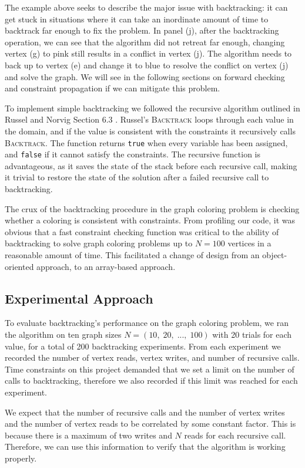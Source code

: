 \documentclass{article}
\begin{document}
		The example above seeks to describe the major issue with backtracking: it can get stuck in situations where it can take an inordinate amount of time to backtrack far enough to fix the problem. In panel (j), after the backtracking operation, we can see that the algorithm did not retreat far enough, changing vertex (g) to pink still results in a conflict in vertex (j). The algorithm needs to back up to vertex (e) and change it to blue to resolve the conflict on vertex (j) and solve the graph. We will see in the following sections on forward checking and constraint propagation if we can mitigate this problem.
		
		To implement simple backtracking we followed the recursive algorithm outlined in Russel and Norvig Section 6.3 \cite{ai}. Russel's \textsc{Backtrack} loops through each value in the domain, and if the value is consistent with the constraints it recursively calls \textsc{Backtrack}. The function returns \texttt{true} when every variable has been assigned, and \texttt{false} if it cannot satisfy the constraints. The recursive function is advantageous, as it saves the state of the stack before each recursive call, making it trivial to restore the state of the solution after a failed recursive call to backtracking. 
		
		The crux of the backtracking procedure in the graph coloring problem is checking whether a coloring is consistent with constraints. From profiling our code, it was obvious that a fast constraint checking function was critical to the ability of backtracking to solve graph coloring problems up to $N=100$ vertices in a reasonable amount of time. This facilitated a change of design from an object-oriented approach, to an array-based approach.
	\subsection{Experimental Approach}
		\label{simple_exp_appr}
		To evaluate backtracking's performance on the graph coloring problem, we ran the algorithm on ten graph sizes $N=(10,\;20,\;...,\;100)$ with 20 trials for each value, for a total of 200 backtracking experiments. From each experiment we recorded the number of vertex reads, vertex writes, and number of recursive calls. Time constraints on this project demanded that we set a limit on the number of calls to backtracking, therefore we also recorded if this limit was reached for each experiment. 
		
		We expect that the number of recursive calls and the number of vertex writes and the number of vertex reads to be correlated by some constant factor. This is because there is a maximum of two writes and $N$ reads for each recursive call. Therefore, we can use this information to verify that the algorithm is working properly.
		
\end{document}
